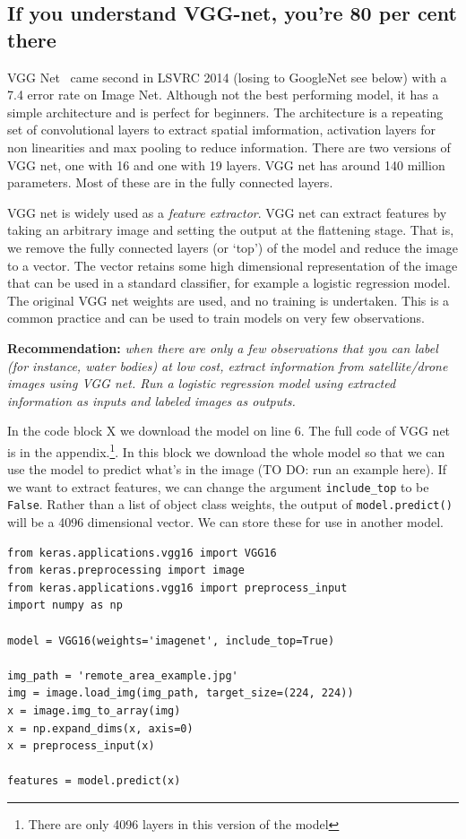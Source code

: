 \documentclass[12pt, a4paper, oneside, headinclude, footinclude]{article}
\begin{document}

\subsection{If you understand VGG-net, you're 80 per cent there}

VGG Net~\cite{SimonyanZ14a} came second in LSVRC 2014 (losing to GoogleNet see
below) with a 7.4 error rate on Image Net. Although not the best performing
model, it has a simple architecture and is perfect for beginners. The
architecture is a repeating set of convolutional layers to extract spatial
imformation, activation layers for non linearities and max pooling to reduce
information. There are two versions of VGG net, one with 16 and one with 19
layers. VGG net has around 140 million parameters. Most of these are in the
fully connected layers. 

VGG net is widely used as a \textit{feature extractor}. VGG net can extract
features by taking an arbitrary image and setting the output at the flattening
stage. That is, we remove the fully connected layers (or `top') of the model
and reduce the image to a vector. The vector retains some high dimensional
representation of the image that can be used in a standard classifier, for
example a logistic regression model. The original VGG net weights are used,
and no training is undertaken. This is a common practice and can be used to
train models on very few observations.

\textbf{Recommendation:} \textit{when there are only a few observations that you can
label (for instance, water bodies) at low cost, extract information from
satellite/drone images using VGG net. Run a logistic regression model using
extracted information as inputs and labeled images as outputs.}

In the code block X we download the model on line 6. The full code of VGG net
is in the appendix.\footnote{There are only 4096 layers in this version of the
model}. In this block we download the whole model so that we can use the model
to predict what's in the image (TO DO: run an example here). If we want to
extract features, we can change the argument \texttt{include\_top} to be
\texttt{False}. Rather than a list of object class weights, the output of
\texttt{model.predict()} will be a 4096 dimensional vector. We can store these
for use in another model.

\begin{verbatim}
from keras.applications.vgg16 import VGG16
from keras.preprocessing import image
from keras.applications.vgg16 import preprocess_input
import numpy as np

model = VGG16(weights='imagenet', include_top=True)

img_path = 'remote_area_example.jpg'
img = image.load_img(img_path, target_size=(224, 224))
x = image.img_to_array(img)
x = np.expand_dims(x, axis=0)
x = preprocess_input(x)

features = model.predict(x)
\end{verbatim}
\end{document}
